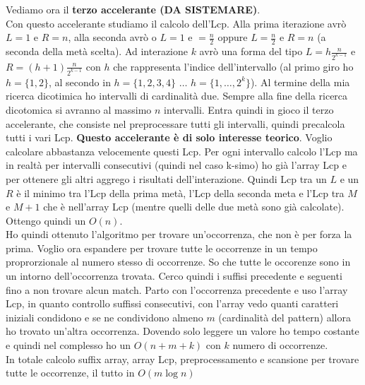 \documentclass[a4paper,12pt, oneside]{book}
\begin{document}
Vediamo ora il \textbf{terzo accelerante (DA SISTEMARE)}.\\
Con questo accelerante studiamo il calcolo dell'Lcp. Alla prima
iterazione avrò $L=1$ e $R=n$, alla seconda avrò o $L=1$ e
$=\frac{n}{2}$ oppure $L=\frac{n}{2}$ e $R=n$ (a seconda della metà
scelta). Ad interazione $k$ avrò una forma del tipo $L=h\frac{n}{2^{k-1}}$ e
$R=(h+1)\frac{n}{2^{k-1}}$ con $h$ che rappresenta l'indice
dell'intervallo (al primo giro ho $h=\{1,2\}$, al secondo in
$h=\{1,2,3,4\}$ $\ldots$ $h=\{1,\ldots, 2^{k}\}$). Al termine
della mia ricerca dicotimica ho intervalli di cardinalità due. Sempre
alla fine della ricerca dicotomica si avranno al massimo $n$
intervalli. Entra quindi in gioco il terzo accelerante, che consiste
nel preprocessare tutti gli intervalli, quindi precalcola tutti i vari
Lcp. \textbf{Questo accelerante è di solo interesse teorico}. Voglio
calcolare abbastanza velocemente questi Lcp. Per ogni intervallo
calcolo l'Lcp ma in realtà per intervalli consecutivi (quindi nel caso
k-simo) ho già l'array Lcp e per ottenere gli altri aggrego i
risultati dell'interazione. Quindi Lcp tra un $L$ e un $R$ è il minimo
tra l'Lcp della prima metà, l'Lcp della seconda meta e l'Lcp tra $M$ e
$M+1$ che è nell'array Lcp (mentre quelli delle due metà sono già
calcolate).
Ottengo quindi un $O(n)$.\\
Ho quindi ottenuto l'algoritmo per trovare un'occorrenza, che non è
per forza la prima. Voglio ora espandere per trovare tutte le
occorrenze in un tempo proprorzionale al numero stesso di
occorrenze. So che tutte le occorenze sono in un intorno
dell'occorrenza trovata. Cerco quindi i suffisi precedente e seguenti
fino a non trovare alcun match. Parto con l'occorrenza precedente e
uso l'array Lcp, in quanto controllo suffissi consecutivi, con l'array
vedo quanti caratteri iniziali condidono e se ne condividono almeno
$m$ (cardinalità del pattern) allora ho trovato un'altra
occorrenza. Dovendo solo leggere un valore ho tempo costante e quindi
nel complesso ho un $O(n+m+k)$ con $k$ numero di occorrenze.\\
In totale calcolo suffix array, array Lcp, preprocessamento e
scansione per trovare tutte le occorrenze, il tutto in $O(m\log n)$
\end{document}

